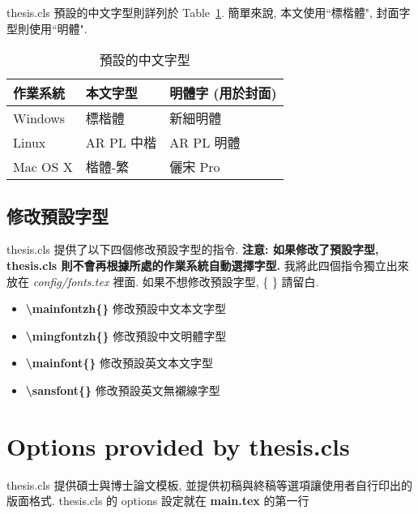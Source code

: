 thesis.cls 預設的中文字型則詳列於 Table~\ref{table:zhfonts}.
簡單來說, 本文使用``標楷體", 封面字型則使用``明體".

\begin{table}[h]
\centering
\caption[Default Chinese font settings]{預設的中文字型}
\label{table:zhfonts}
\begin{tabular}{@{}lll@{}}
\toprule
作業系統     & 本文字型     & 明體字 (用於封面) \\ \midrule
Windows  & 標楷體      & 新細明體       \\
Linux    & AR PL 中楷 & AR PL 明體   \\
Mac OS X & 楷體-繁     & 儷宋 Pro     \\ \bottomrule
\end{tabular}
\end{table}

\subsection{修改預設字型}

thesis.cls 提供了以下四個修改預設字型的指令.
\textbf{注意: 如果修改了預設字型, thesis.cls 則不會再根據所處的作業系統自動選擇字型.}
我將此四個指令獨立出來放在 \textit{config/fonts.tex} 裡面.
如果不想修改預設字型, \{ \} 請留白.

\begin{itemize}

\item \textbf{\textbackslash mainfontzh\{\}} 修改預設中文本文字型

\item \textbf{\textbackslash mingfontzh\{\}} 修改預設中文明體字型

\item \textbf{\textbackslash mainfont\{\}} 修改預設英文本文字型

\item \textbf{\textbackslash sansfont\{\}} 修改預設英文無襯線字型

\end{itemize}


\section{Options provided by thesis.cls}

thesis.cls 提供碩士與博士論文模板, 並提供初稿與終稿等選項讓使用者自行印出的版面格式.
thesis.cls 的 options 設定就在 \textbf{main.tex} 的第一行

